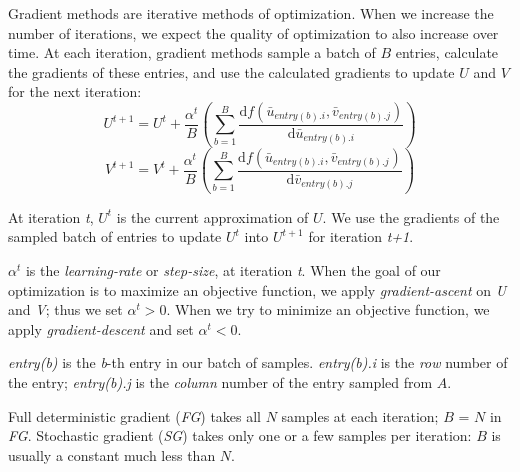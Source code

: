 Gradient methods are iterative methods of optimization.  
When we increase the number of iterations, we expect the quality of optimization to also increase over time.
At each iteration, gradient methods sample a batch of $B$ entries, calculate the gradients of these entries, and use the calculated gradients to update $U$ and $V$ for the next iteration:
\begin{equation} \label{eq:Ut}
U^{t+1} = U^t + \frac{\alpha^{t}}{B}\left(\sum_{b=1}^{B}\frac{\text{d}f(\bar{u}_{entry(b).i}, \bar{v}_{entry(b).j})}{\text{d}\bar{u}_{entry(b).i}}\right)
\end{equation}
\begin{equation} \label{eq:Vt}
V^{t+1} = V^t + \frac{\alpha^{t}}{B}\left(\sum_{b=1}^{B}\frac{\text{d}f(\bar{u}_{entry(b).i}, \bar{v}_{entry(b).j})}{\text{d}\bar{v}_{entry(b).j}}\right)
\end{equation}

At iteration \emph{t}, $U^{t}$ is the current approximation of $U$.
We use the gradients of the sampled batch of entries to update $U^{t}$ into $U^{t+1}$ for iteration \emph{t+1}.

$\alpha^{t}$ is the \emph{learning-rate} or \emph{step-size}, at iteration \emph{t}.  
When the goal of our optimization is to maximize an objective function, we apply \emph{gradient-ascent} on \emph{U} and \emph{V}; thus we set $\alpha^{t} > 0$.
When we try to minimize an objective function, we apply \emph{gradient-descent} and set $\alpha^{t} < 0$.

\emph{entry(b)} is the \emph{b}-th entry in our batch of samples.  
\emph{entry(b).i} is the \emph{row} number of the entry; \emph{entry(b).j} is the \emph{column} number of the entry sampled from $A$.

Full deterministic gradient (\emph{FG}) takes all $N$ samples at each iteration;  $B$ = $N$ in \emph{FG}.
Stochastic gradient (\emph{SG}) takes only one or a few samples per iteration: $B$ is usually a constant much less than $N$.


